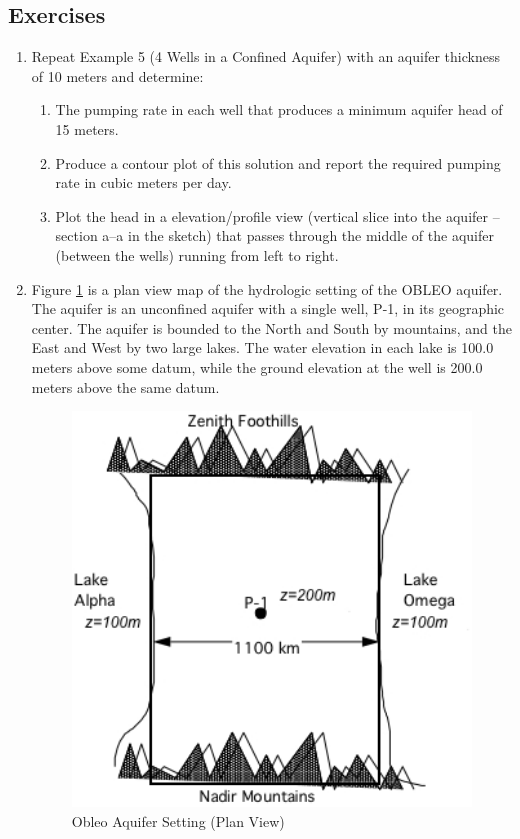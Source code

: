 \subsection{Exercises}
\begin{enumerate}
\item Repeat Example 5 (4 Wells in a Confined Aquifer) with an aquifer thickness of 10 meters and determine:
\begin{enumerate}
\item The pumping rate in each well that produces a minimum aquifer head of 15 meters.
\item Produce a contour plot of this solution and report the required pumping rate in cubic meters per day.
\item Plot the head in a elevation/profile view (vertical slice into the aquifer -- section a--a in the sketch) that passes through the middle of the aquifer (between the wells) running from left to right.
\end{enumerate}


\item Figure \ref{fig:Obleo} is a plan view map of the hydrologic setting of the OBLEO aquifer.  
The aquifer is an unconfined aquifer with a single well, P-1, in its geographic center.  
The aquifer is bounded to the North and South by mountains, and the East and West by two large lakes.  
The water elevation in each lake is 100.0 meters above some datum, while the ground elevation at the well is 200.0 meters above the same datum.

\begin{figure}[h!] %
   \centering
   \includegraphics[width=6in]{./17-SteadyGroundwaterFlow/Obleo.jpg} 
   \caption{Obleo Aquifer Setting (Plan View)}
   \label{fig:Obleo}
\end{figure}


\end{enumerate}
